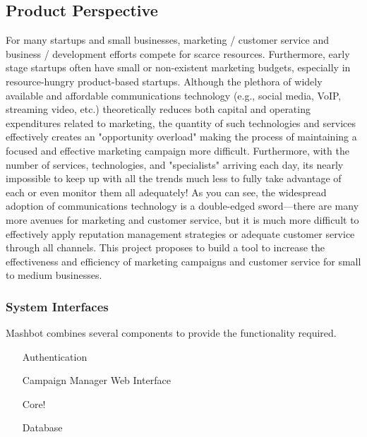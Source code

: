 \documentclass{article}
\begin{document}
	\subsection{Product Perspective}
		For many startups and small businesses, marketing /
                customer service and business / development efforts
                compete for scarce resources.  Furthermore, early
                stage startups often have small or non-existent
                marketing budgets, especially in resource-hungry
                product-based startups.  Although the plethora of
                widely available and affordable communications
                technology (e.g., social media, VoIP, streaming video,
                etc.) theoretically reduces both capital and operating
                expenditures related to marketing, the quantity of
                such technologies and services effectively creates an
                "opportunity overload" making the process of
                maintaining a focused and effective marketing campaign
                more difficult.  Furthermore, with the number of
                services, technologies, and "specialists" arriving
                each day, its nearly impossible to keep up with all
                the trends much less to fully take advantage of each
                or even monitor them all adequately! As you can see,
                the widespread adoption of communications technology
                is a double-edged sword---there are many more avenues
                for marketing and customer service, but it is much
                more difficult to effectively apply reputation
                management strategies or adequate customer service
                through all channels. This project proposes to build a
                tool to increase the effectiveness and efficiency of
                marketing campaigns and customer service for small to
                medium businesses.
		\subsubsection{System Interfaces}
			Mashbot combines several components to provide the functionality
			required.
			\begin{itemize}
				\item[Authentication]
				\item[Campaign Manager Web Interface]
				\item[Core!]
				\item[Database]
			\end{itemize}
\end{document}
